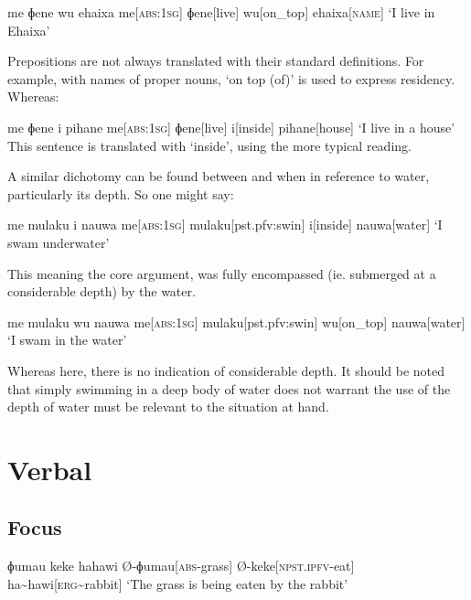 \ex
\begingl
\glpreamble me ɸene wu ehaixa
\endpreamble
me[\textsc{abs:1sg}]
ɸene[live]
wu[on\_top]
ehaixa[\textsc{name}]
\glft `I live in Ehaixa'
\endgl
\xe

Prepositions are not always translated with their standard definitions. For example, with names of proper nouns,  `on top (of)' is used to express residency. Whereas:

\ex
\begingl
\glpreamble me ɸene i pihane
\endpreamble
me[\textsc{abs:1sg}]
ɸene[live]
i[inside]
pihane[house]
\glft `I live in a house'
\endgl
\xe
This sentence is translated with  `inside', using the more typical reading.

A similar dichotomy can be found between  and  when in reference to water, particularly its depth. So one might say:

\ex
\begingl
\glpreamble me mulaku i nauwa
\endpreamble
me[\textsc{abs:1sg}]
mulaku[pst.pfv:swin]
i[inside]
nauwa[water]
\glft `I swam underwater'
\endgl
\xe

This meaning the core argument,  was fully encompassed (ie. submerged at a considerable depth) by the water.

\ex
\begingl
\glpreamble me mulaku wu nauwa
\endpreamble
me[\textsc{abs:1sg}]
mulaku[pst.pfv:swin]
wu[on\_top]
nauwa[water]
\glft `I swam in the water'
\endgl
\xe

Whereas here, there is no indication of considerable depth. It should be noted that simply swimming in a deep body of water does not warrant the use of  the depth of water must be relevant to the situation at hand.

\chapter{Verbal}

\section{Focus}

\ex
\begingl
\glpreamble ɸumau keke hahawi
\endpreamble
Ø-ɸumau[\textsc{abs-}grass]
Ø-keke[\textsc{npst.ipfv-}eat]
ha\textasciitilde hawi[\textsc{erg\textasciitilde}rabbit]
\glft `The grass is being eaten by the rabbit'
\endgl
\xe

